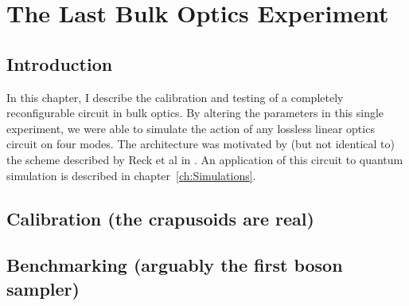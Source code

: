 \chapter{The Last Bulk Optics Experiment}
\label{ch:BulkCircuit}

\section{Introduction}
In this chapter, I describe the calibration and testing of a completely
reconfigurable circuit in bulk optics. By altering the parameters in this single
experiment, we were able to simulate the action of any lossless linear optics
circuit on four modes. The architecture was motivated by (but not identical to)
the scheme described by Reck et al in \cite{reck94}. An application of this
circuit to quantum simulation is described in chapter~\ref{ch:Simulations}.

\section{Calibration (the crapusoids are real)}

\section{Benchmarking (arguably the first boson sampler)}
